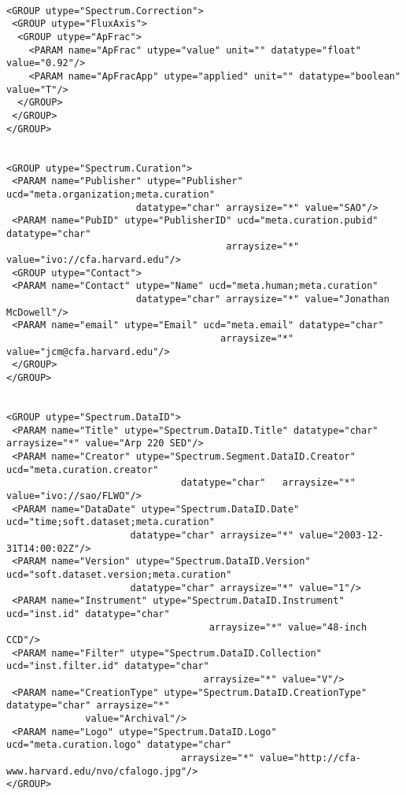 {\begin{flushleft}
\begin{fmpage}
\begin{verbatim}
\end{verbatim}
\end{fmpage}

\begin{fmpage}
\begin{verbatim}

<GROUP utype="Spectrum.Correction">
 <GROUP utype="FluxAxis">
  <GROUP utype="ApFrac">
    <PARAM name="ApFrac" utype="value" unit="" datatype="float" value="0.92"/>
    <PARAM name="ApFracApp" utype="applied" unit="" datatype="boolean" value="T"/>
  </GROUP>
 </GROUP>
</GROUP>


<GROUP utype="Spectrum.Curation">
 <PARAM name="Publisher" utype="Publisher" ucd="meta.organization;meta.curation" 
                       datatype="char" arraysize="*" value="SAO"/>
 <PARAM name="PubID" utype="PublisherID" ucd="meta.curation.pubid" datatype="char" 
                                       arraysize="*" value="ivo://cfa.harvard.edu"/>
 <GROUP utype="Contact">
 <PARAM name="Contact" utype="Name" ucd="meta.human;meta.curation" 
                       datatype="char" arraysize="*" value="Jonathan McDowell"/>
 <PARAM name="email" utype="Email" ucd="meta.email" datatype="char" 
                                      arraysize="*" value="jcm@cfa.harvard.edu"/>
 </GROUP>
</GROUP>


<GROUP utype="Spectrum.DataID">
 <PARAM name="Title" utype="Spectrum.DataID.Title" datatype="char" arraysize="*" value="Arp 220 SED"/>
 <PARAM name="Creator" utype="Spectrum.Segment.DataID.Creator" ucd="meta.curation.creator" 
                               datatype="char"   arraysize="*" value="ivo://sao/FLWO"/>
 <PARAM name="DataDate" utype="Spectrum.DataID.Date" ucd="time;soft.dataset;meta.curation"
                      datatype="char" arraysize="*" value="2003-12-31T14:00:02Z"/>
 <PARAM name="Version" utype="Spectrum.DataID.Version" ucd="soft.dataset.version;meta.curation" 
                      datatype="char" arraysize="*" value="1"/>
 <PARAM name="Instrument" utype="Spectrum.DataID.Instrument" ucd="inst.id" datatype="char" 
                                    arraysize="*" value="48-inch CCD"/>
 <PARAM name="Filter" utype="Spectrum.DataID.Collection" ucd="inst.filter.id" datatype="char" 
                                   arraysize="*" value="V"/>
 <PARAM name="CreationType" utype="Spectrum.DataID.CreationType" datatype="char" arraysize="*" 
              value="Archival"/>
 <PARAM name="Logo" utype="Spectrum.DataID.Logo" ucd="meta.curation.logo" datatype="char" 
                               arraysize="*" value="http://cfa-www.harvard.edu/nvo/cfalogo.jpg"/>
</GROUP>




\end{verbatim}
\end{fmpage}
\end{flushleft}}

